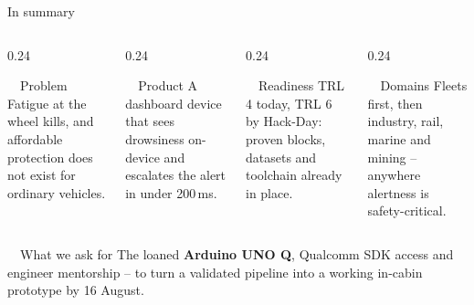 \documentclass[aspectratio=169, 10pt]{beamer}
\begin{document}
\begin{frame}{In summary}
  \vspace{0.5em}
  \begin{columns}[T]
    \begin{column}{0.24\textwidth}
      \begin{card}{\faExclamationTriangle~~Problem}
        \scriptsize Fatigue at the wheel kills, and affordable protection does not exist for ordinary vehicles.
      \end{card}
    \end{column}
    \begin{column}{0.24\textwidth}
      \begin{card}{\faBoxOpen~~Product}
        \scriptsize A dashboard device that sees drowsiness on-device and escalates the alert in under 200\,ms.
      \end{card}
    \end{column}
    \begin{column}{0.24\textwidth}
      \begin{card}{\faCheckCircle~~Readiness}
        \scriptsize TRL 4 today, TRL 6 by Hack-Day: proven blocks, datasets and toolchain already in place.
      \end{card}
    \end{column}
    \begin{column}{0.24\textwidth}
      \begin{card}{\faGlobeAsia~~Domains}
        \scriptsize Fleets first, then industry, rail, marine and mining -- anywhere alertness is safety-critical.
      \end{card}
    \end{column}
  \end{columns}
  \vspace{1.2em}
  \begin{center}
    \begin{goldcard}[width=0.92\textwidth]{\faHandshake~~What we ask for}
      \small The loaned \textbf{Arduino UNO Q}, Qualcomm SDK access and engineer mentorship -- to turn a validated pipeline into a working in-cabin prototype by 16 August.
    \end{goldcard}
  \end{center}
\end{frame}

\end{document}

